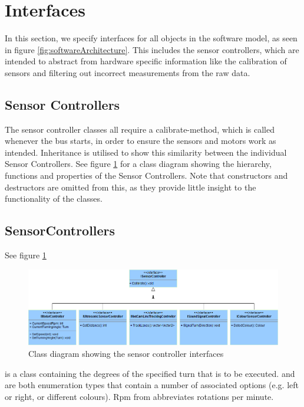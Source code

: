 \section{Interfaces}
In this section, we specify interfaces for all objects in the software model, as seen in figure \ref{fig:softwareArchitecture}. This includes the sensor controllers, which are intended to abstract from hardware specific information like the calibration of sensors and filtering out incorrect measurements from the raw data. 

\subsection{Sensor Controllers}
The sensor controller classes all require a calibrate-method, which is called whenever the bus starts, in order to ensure the sensors and motors work as intended. Inheritance is utilised to show this similarity between the individual Sensor Controllers. See figure \ref{fig:interfaceSensorControllers} for a class diagram showing the hierarchy, functions and properties of the Sensor Controllers. Note that constructors and destructors are omitted from this, as they provide little insight to the functionality of the classes. 

\subsection{SensorControllers}
See figure \ref{fig:interfaceSensorControllers} 

\begin{figure}[ht]
    \includegraphics[width=\textwidth]{Images/Design/InterfaceSensorControllers.png}
    \caption{Class diagram showing the sensor controller interfaces}
    \label{fig:interfaceSensorControllers}
\end{figure}

 is a class containing the degrees of the specified turn that is to be executed.  and  are both enumeration types that contain a number of associated options (e.g. left or right, or different colours). Rpm from  abbreviates rotations per minute.

